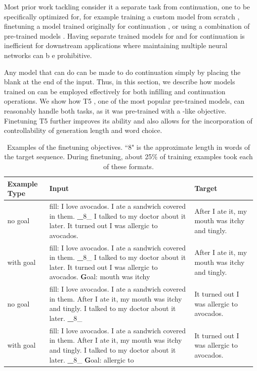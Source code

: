 Most prior work tackling \FitB{} consider it a separate task from continuation, one to be specifically optimized for, for example training a custom model from scratch \citep{ippolito2019unsupervised,zhu2019text,mori2020finding}, finetuning a model trained originally for continuation \citep{donahue2020enabling}, or using a combination of pre-trained models \citep{huang2020inset}.
Having separate trained models for \FitB{} and for continuation is inefficient for downstream applications where maintaining multiple neural networks can b e prohibitive.

Any model that can do \FitB{} can be made to do continuation simply by placing the blank at the end of the input.
Thus, in this section, we describe how models trained on \FitB{} can be employed effectively for both infilling and continuation operations.
We show how T5 \citep{raffel2019exploring}, one of the most popular pre-trained models, can reasonably handle both tasks, as it was pre-trained with a \FitB-like objective.
Finetuning T5 further improves its ability and also allows for the incorporation of controllability of generation length and word choice.


\begin{table}[t]
  \centering
  \small
  \caption{Examples of the finetuning objectives. ``8" is the approximate length in words of the target sequence. During finetuning, about 25\% of training examples took each of these formats.}
    \begin{tabular}{p{}p{}p{}}
    \midrule
    Example Type & Input & Target \\
    \midrule
     \cFITB{} no goal & fill: I love avocados. I ate a sandwich covered in them. {\textbf \_8\_} I talked to my doctor about it later. It turned out I was allergic to avocados. & After I ate it, my mouth was itchy and tingly. \\
    \midrule
     \cFITB{}  with goal & fill: I love avocados. I ate a sandwich covered in them.  {\textbf \_8\_} I talked to my doctor about it later. It turned out I was allergic to avocados.  {\textbf Goal: mouth was itchy} & After I ate it, my mouth was itchy and tingly. \\
    \midrule
     \cFITB{} no goal& fill: I love avocados. I ate a sandwich covered in them. After I ate it, my mouth was itchy and tingly. I talked to my doctor about it later.  {\textbf \_8\_}  & It turned out I was allergic to avocados. \\
    \midrule
     \cFITE{} with goal & fill: I love avocados. I ate a sandwich covered in them. After I ate it, my mouth was itchy and tingly. I talked to my doctor about it later.  {\textbf \_8\_}   {\textbf Goal: allergic to} & It turned out I was allergic to avocados. \\
    \midrule
    \end{tabular}
   \vspace{-0.6em}
  \label{tab:task_examples}
  \vspace{-1em}
\end{table}%

